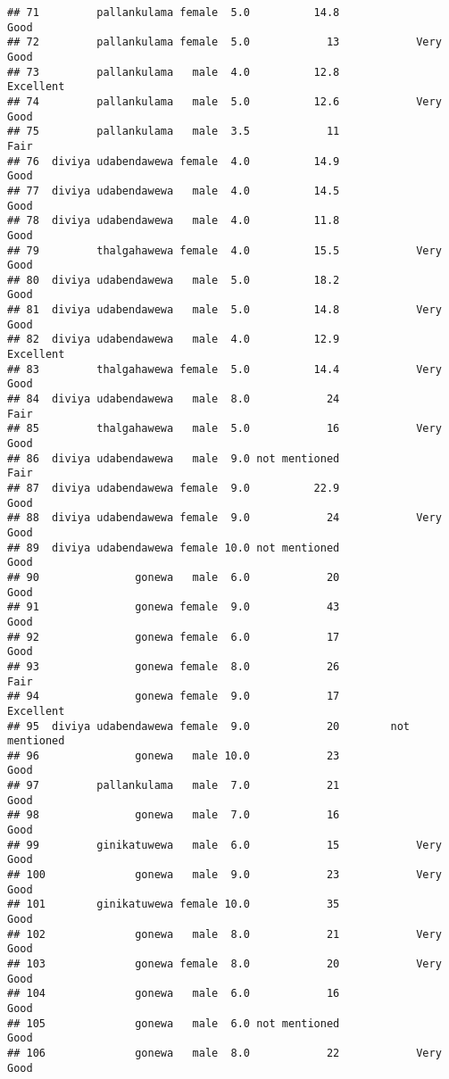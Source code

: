 \documentclass[
]{article}
\begin{document}
\begin{verbatim}
## 71         pallankulama female  5.0          14.8                 Good
## 72         pallankulama female  5.0            13            Very Good
## 73         pallankulama   male  4.0          12.8            Excellent
## 74         pallankulama   male  5.0          12.6            Very Good
## 75         pallankulama   male  3.5            11                 Fair
## 76  diviya udabendawewa female  4.0          14.9                 Good
## 77  diviya udabendawewa   male  4.0          14.5                 Good
## 78  diviya udabendawewa   male  4.0          11.8                 Good
## 79         thalgahawewa female  4.0          15.5            Very Good
## 80  diviya udabendawewa   male  5.0          18.2                 Good
## 81  diviya udabendawewa   male  5.0          14.8            Very Good
## 82  diviya udabendawewa   male  4.0          12.9            Excellent
## 83         thalgahawewa female  5.0          14.4            Very Good
## 84  diviya udabendawewa   male  8.0            24                 Fair
## 85         thalgahawewa   male  5.0            16            Very Good
## 86  diviya udabendawewa   male  9.0 not mentioned                 Fair
## 87  diviya udabendawewa female  9.0          22.9                 Good
## 88  diviya udabendawewa female  9.0            24            Very Good
## 89  diviya udabendawewa female 10.0 not mentioned                 Good
## 90               gonewa   male  6.0            20                 Good
## 91               gonewa female  9.0            43                 Good
## 92               gonewa female  6.0            17                 Good
## 93               gonewa female  8.0            26                 Fair
## 94               gonewa female  9.0            17            Excellent
## 95  diviya udabendawewa female  9.0            20        not mentioned
## 96               gonewa   male 10.0            23                 Good
## 97         pallankulama   male  7.0            21                 Good
## 98               gonewa   male  7.0            16                 Good
## 99         ginikatuwewa   male  6.0            15            Very Good
## 100              gonewa   male  9.0            23            Very Good
## 101        ginikatuwewa female 10.0            35                 Good
## 102              gonewa   male  8.0            21            Very Good
## 103              gonewa female  8.0            20            Very Good
## 104              gonewa   male  6.0            16                 Good
## 105              gonewa   male  6.0 not mentioned                 Good
## 106              gonewa   male  8.0            22            Very Good

\end{verbatim}
\end{document}
